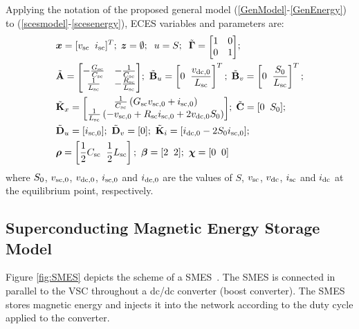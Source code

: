 \documentclass[journal, a4paper]{IEEEtran}
\begin{document}
Applying the notation of the proposed general model (\ref{GenModel}-\ref{GenEnergy})
to (\ref{scesmodel}-\ref{scesenergy}), ECES variables and
parameters are:
\begin{alignat}{1}
  \nonumber & \boldsymbol{x} = [v_{\rm sc} \; \; i_{\rm sc}]^T; \;
  \boldsymbol{z} = \emptyset; \; \; u = S; \; \;
  \tilde{\mathbf{\Gamma}} = {\scriptscriptstyle{\begin{bmatrix} 1 & 0
        \\ 0 & 1 \end{bmatrix}}} ; \\ \nonumber & \tilde{\mathbf{A}} =
        {\scriptscriptstyle{\begin{bmatrix} -\frac{G_{\rm sc}}{C_{\rm
                  sc}} & -\frac{1}{C_{\rm sc}} \\ \frac{1}{L_{\rm sc}}
              & -\frac{R_{\rm sc}}{L_{\rm sc}} \end{bmatrix}}}
        ;\ \tilde{\mathbf{B}}_u = \left[ 0 \; \; \frac{v_{\rm
              dc,0}}{L_{\rm sc}} \right]^T; \; \tilde{\mathbf{B}}_v =
        \left[ 0 \; \; \frac{S_{\rm 0}}{L_{\rm sc}} \right]^T;
        \\ \nonumber & \tilde{\mathbf{K}}_x = {\scriptscriptstyle
          {\begin{bmatrix} \frac{1}{C_{\rm sc}} \left( G_{\rm
                sc}v_{\rm sc,0} + i_{\rm sc,0} \right)
              \\ \frac{1}{L_{\rm sc}} \left( -v_{\rm sc,0} + R_{\rm
                sc} i_{\rm sc,0} + 2 v_{\rm dc,0} S_{\rm 0}
              \right) \end{bmatrix}}}; \; \tilde{\mathbf{C}} = [0 \;
          \; S_{\rm 0}] ; \\ \nonumber & \tilde{\mathbf{D}}_u =
           [i_{\rm sc,0}] ;\ \tilde{\mathbf{D}}_v =
           [0];\ \tilde{\mathbf{K}}_i = [i_{\rm dc,0} - 2 S_{\rm 0}
             i_{\rm sc,0}]; \\ \nonumber & \boldsymbol{\rho} = \left[
             \frac{1}{2} C_{\rm sc} \; \; \frac{1}{2} L_{\rm sc}
             \right] ;\ \boldsymbol{\beta} = [2 \; \; 2]
           ;\ \boldsymbol{\chi} = [0 \; \; 0]
\end{alignat}
where $S_{\rm 0}$, $v_{\rm sc,0}$, $v_{\rm dc,0}$, $i_{\rm sc,0}$ and
$i_{\rm dc,0}$ are the values of $S$, $v_{\rm sc}$, $v_{\rm dc}$,
$i_{\rm sc}$ and $i_{\rm dc}$ at the equilibrium point, respectively.

\subsection{Superconducting Magnetic Energy Storage Model}
\label{subsec:smes}
Figure \ref{fig:SMES} depicts the scheme of a 
SMES~\cite{IEEEtaskforce:06}.  The SMES is connected
in parallel to the VSC throughout a dc/dc converter (boost converter).
The SMES stores magnetic energy and injects it into the network
according to the duty cycle applied to the converter.
\end{document}
